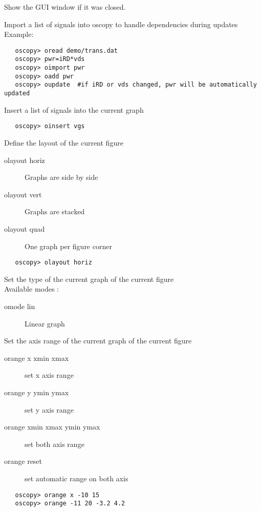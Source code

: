 \documentclass[a4paper,11pt]{article}
\begin{document}
   Show the GUI window if it was closed.

   Import a list of signals into oscopy to handle dependencies during updates
   Example:
\begin{verbatim}
   oscopy> oread demo/trans.dat
   oscopy> pwr=iRD*vds
   oscopy> oimport pwr
   oscopy> oadd pwr
   oscopy> oupdate  #if iRD or vds changed, pwr will be automatically updated
\end{verbatim}

   Insert a list of signals into the current graph
\begin{verbatim}
   oscopy> oinsert vgs
\end{verbatim}

   Define the layout of the current figure
   \begin{description}
   \item[olayout horiz] Graphs are side by side
   \item[olayout vert] Graphs are stacked
   \item[olayout quad] One graph per figure corner
   \end{description}
\begin{verbatim}
   oscopy> olayout horiz
\end{verbatim}

   Set the type of the current graph of the current figure\\
   Available modes :
   \begin{description}
   \item[omode lin]      Linear graph
   \end{description}

   Set the axis range of the current graph of the current figure
   \begin{description}
   \item[orange x xmin xmax] set x axis range
   \item[orange y ymin ymax] set y axis range
   \item[orange xmin xmax ymin ymax] set both axis range
   \item[orange reset] set automatic range on both axis
   \end{description}
\begin{verbatim}
   oscopy> orange x -10 15
   oscopy> orange -11 20 -3.2 4.2
\end{verbatim}
\end{document}
